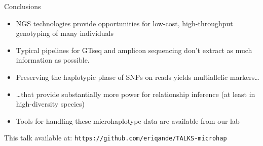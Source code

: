 \documentclass[letter,graphicx]{beamer}
\begin{document}
\begin{frame}{Conclusions}
\begin{itemize}
\item NGS technologies provide opportunities for low-cost, high-throughput
genotyping of many individuals
\item Typical pipelines for GTseq and amplicon sequencing don't extract as
much information as possible.
\item Preserving the haplotypic phase of SNPs on reads yields multiallelic markers\ldots
\item \ldots that provide substantially more power for relationship inference
(at least in high-diversity species)
\item Tools for handling these microhaplotype data are available from our lab
\end{itemize}


This talk available at:
{\tt https://github.com/eriqande/TALKS-microhap}
\end{frame}
\end{document}
